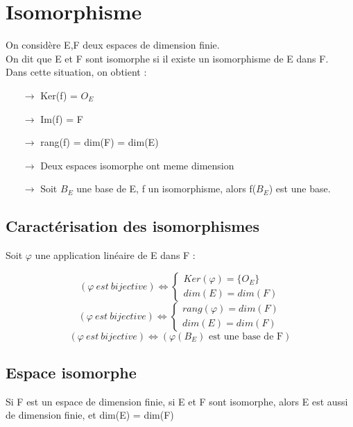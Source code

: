 \section{Isomorphisme}
\begin{de}
On considère E,F deux espaces de dimension finie.\\
On dit que E et F sont isomorphe si il existe un isomorphisme de E dans F.\\
Dans cette situation, on obtient :
\begin{itemize}
 \item[$\rightarrow$] Ker(f) = {$O_E$}
 \item[$\rightarrow$] Im(f) = F
 \item[$\rightarrow$] rang(f) = dim(F) = dim(E)
 \item[$\rightarrow$] Deux espaces isomorphe ont meme dimension
 \item[$\rightarrow$] Soit $B_E$ une base de E, f un isomorphisme, alors f($B_E$) est une base.
\end{itemize}
\subsection{Caractérisation des isomorphismes}
Soit $\varphi$ une application linéaire de E dans F :
\begin{prop}
 $$( \varphi~ est~ bijective) \Leftrightarrow \left\{\begin{array}{l}
  Ker(\varphi) = \{O_E\} \\
   dim(E) = dim(F)
  \end{array}\right.$$
 $$( \varphi~ est~ bijective) \Leftrightarrow \left\{\begin{array}{l}
  rang(\varphi) = dim(F) \\
   dim(E) = dim(F)
  \end{array}\right.$$
 $$( \varphi~ est~ bijective) \Leftrightarrow (\varphi(B_E) \mbox{ est une base de F})$$
\end{prop}
\end{de}
\subsection{Espace isomorphe}
\begin{theo}
Si F est un espace de dimension finie, si E et F sont isomorphe, alors E est aussi de dimension finie, et dim(E) = dim(F)
\end{theo}
